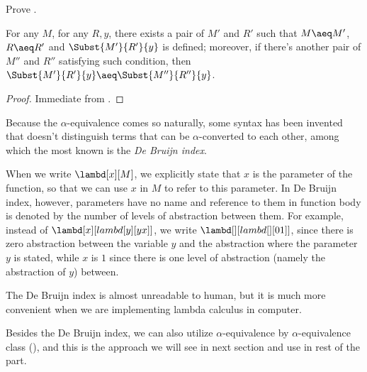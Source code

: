 \documentclass[../../../include/open-logic-section]{subfiles}
\begin{document}
\begin{prob}
  Prove .
\end{prob}

\begin{cor}
  For any $M$, for any $R, y$, there exists a pair of $M'$ and $R'$
  such that $M \aeq M'$, $R \aeq R'$ and $\Subst{M'}{R'}{y}$ is defined; moreover,
  if there's another pair of
  $M''$ and $R''$ satisfying such condition, then $\Subst{M'}{R'}{y} \aeq \Subst{M''}{R''}{y}$.
\end{cor}
\begin{proof}
  Immediate from .
\end{proof}

\begin{digress}
  Because the $\alpha$-equivalence comes so naturally, some syntax has
  been invented that doesn't distinguish terms that can be
  $\alpha$-converted to each other, among which the most known is the
  \emph{De Bruijn index}.
  
  When we write $\lambd[x][M]$, we explicitly state that $x$ is the
  parameter of the function, so that we can use $x$ in $M$ to refer
  to this parameter. In De Bruijn index, however, parameters have no
  name and reference to them in function body is denoted by the number of levels of
  abstraction between them. For example, instead of $\lambd[x][lambd[y][y
  x]]$, we write $\lambd[][lambd[][0 1]]$, since there is zero
  abstraction between the variable $y$ and the abstraction where the
  parameter $y$ is stated, while $x$ is $1$ since there is one level
  of abstraction (namely the abstraction of $y$) between.

  The De Bruijn index is almost unreadable to human, but it is
  much more convenient when we are implementing lambda calculus in
  computer.
\end{digress}

Besides the De Bruijn index, we can also utilize $\alpha$-equivalence
by $\alpha$-equivalence class (), and this is
the approach we will see in next section and use in rest of the part.
\end{document}

